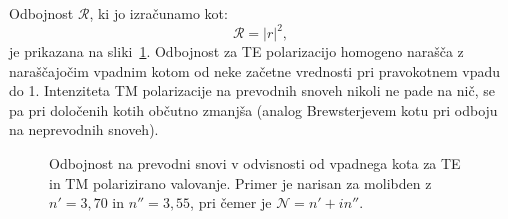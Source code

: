 Odbojnost $\mathcal{R}$, ki jo izračunamo kot:
\begin{equation}
\mathcal{R} = |r|^2,
\label{eq:04_100a}
\end{equation}
je prikazana na sliki~\ref{fig:04_kovina}. Odbojnost za TE polarizacijo
homogeno narašča z naraščajočim vpadnim kotom 
od neke začetne vrednosti pri pravokotnem vpadu do 1. 
Intenziteta TM polarizacije na prevodnih snoveh 
nikoli ne pade na nič, se pa pri določenih kotih občutno
zmanjša (analog Brewsterjevem kotu pri odboju na neprevodnih snoveh).
\begin{figure}[ht]
\centering
\def\svgwidth{70truemm} 

\caption{Odbojnost na prevodni snovi v odvisnosti od vpadnega kota za TE in TM polarizirano
valovanje. Primer je narisan za molibden z $n'=3,70$ in $n''=3,55$, pri čemer je $\mathcal{N} = n'+in''$.}
\label{fig:04_kovina}
\end{figure}

